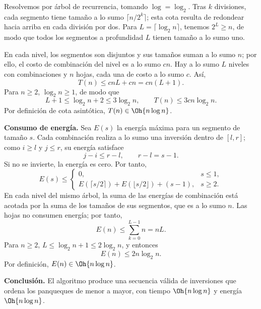 Resolvemos por árbol de recurrencia, tomando $\log=\log_2$. Tras $k$ divisiones, cada segmento tiene tamaño a lo sumo $\lceil n/2^k\rceil$; esta cota resulta de redondear hacia arriba en cada división por dos. Para $L=\lceil\log_2 n\rceil$, tenemos $2^L\ge n$, de modo que todos los segmentos a profundidad $L$ tienen tamaño a lo sumo uno.

En cada nivel, los segmentos son disjuntos y sus tamaños suman a lo sumo $n$; por ello, el costo de combinación del nivel es a lo sumo $cn$. Hay a lo sumo $L$ niveles con combinaciones y $n$ hojas, cada una de costo a lo sumo $c$. Así,
\[
T(n)\le cnL+cn=cn(L+1).
\]
Para $n\ge2$, $\log_2 n\ge1$, de modo que
\[
L+1\le\log_2 n+2\le3\log_2 n,
\qquad
T(n)\le3cn\log_2 n.
\]
Por definición de cota asintótica, $T(n)\in\Oh{n\log n}$.

\textbf{Consumo de energía.} Sea $E(s)$ la energía máxima para un segmento de tamaño $s$. Cada combinación realiza a lo sumo una inversión dentro de $[l,r]$; como $i\ge l$ y $j\le r$, su energía satisface
\[
j-i\le r-l,
\qquad r-l=s-1.
\]
Si no se invierte, la energía es cero. Por tanto,
\[
E(s)\le
\begin{cases}
0, & s\le1,\\
E(\lceil s/2\rceil)+E(\lfloor s/2\rfloor)+(s-1), & s\ge2.
\end{cases}
\]
En cada nivel del mismo árbol, la suma de las energías de combinación está acotada por la suma de los tamaños de sus segmentos, que es a lo sumo $n$. Las hojas no consumen energía; por tanto,
\[
E(n)\le\sum_{k=0}^{L-1}n=nL.
\]
Para $n\ge2$, $L\le\log_2 n+1\le2\log_2 n$, y entonces
\[
E(n)\le2n\log_2 n.
\]
Por definición, $E(n)\in\Oh{n\log n}$.

\textbf{Conclusión.} El algoritmo produce una secuencia válida de inversiones que ordena los panqueques de menor a mayor, con tiempo $\Oh{n\log n}$ y energía $\Oh{n\log n}$.
\fin
